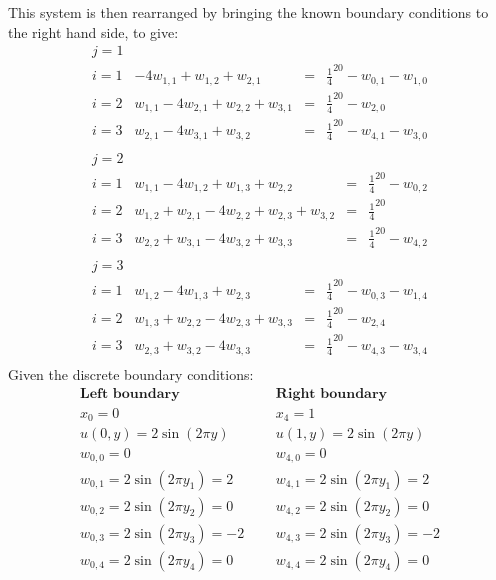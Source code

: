 This system is then rearranged by bringing the known boundary conditions to the right hand side, to give:
\[\begin{array}{l|rcl}
j=1\\
i=1&-4w_{1,1}+w_{1,2}+w_{2,1}&=&\frac{1}{4}^20-w_{0,1}-w_{1,0}\\
i=2&w_{1,1}-4w_{2,1}+w_{2,2}+w_{3,1}&=&\frac{1}{4}^20-w_{2,0}\\
i=3&w_{2,1}-4w_{3,1}+w_{3,2}&=&\frac{1}{4}^20-w_{4,1}-w_{3,0}\\
\end{array}
\]	
\[\begin{array}{l|rcl}
j=2\\
i=1&w_{1,1}-4w_{1,2}+w_{1,3}+w_{2,2}&=&\frac{1}{4}^20-w_{0,2}\\
i=2&w_{1,2}+w_{2,1}-4w_{2,2}+w_{2,3}+w_{3,2}&=&\frac{1}{4}^20\\
i=3&w_{2,2}+w_{3,1}-4w_{3,2}+w_{3,3}&=&\frac{1}{4}^20-w_{4,2}\\
\end{array}
\]	
\[\begin{array}{l|rcl}
j=3\\
i=1&w_{1,2}-4w_{1,3}+w_{2,3}&=&\frac{1}{4}^20-w_{0,3}-w_{1,4}\\
i=2&w_{1,3}+w_{2,2}-4w_{2,3}+w_{3,3}&=&\frac{1}{4}^20-w_{2,4}\\
i=3&w_{2,3}+w_{3,2}-4w_{3,3}&=&\frac{1}{4}^20-w_{4,3}-w_{3,4}\\
\end{array}
\]	
Given the discrete boundary conditions:
\[
\begin{array}{lcl}
\textbf{Left boundary}&\ \ \ & \textbf{Right boundary}\\ 
x_0=0&\ \ \ & x_4=1\\ 
u(0,y)=2\sin(2\pi y)&\ \ \ & u(1,y)=2\sin(2\pi y)\\

w_{0,0}=0 &\ \ \ & w_{4,0}=0\\ 
w_{0,1}=2\sin(2\pi y_1) =2 & \ \ \ & w_{4,1}=2\sin(2\pi y_1) =2\\

w_{0,2}=2\sin(2\pi y_2) =0 & \ \ \ & w_{4,2}=2\sin(2\pi y_2) =0\\

w_{0,3}=2\sin(2\pi y_3) =-2 & \ \ \ & w_{4,3}=2\sin(2\pi y_3) =-2\\

w_{0,4}=2\sin(2\pi y_4) =0 & \ \ \ & w_{4,4}=2\sin(2\pi y_4) =0\\

\end{array}
\]
